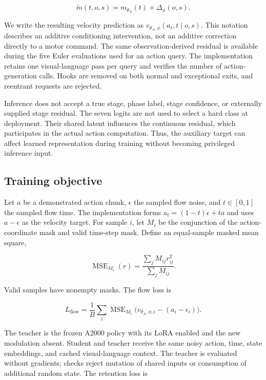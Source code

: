 \documentclass[10pt,twocolumn,letterpaper]{article}
\begin{document}
\begin{equation}\widetilde m(t,o,s)=m_{\theta_A}(t)+\Delta_\phi(o,s).\end{equation}

We write the resulting velocity prediction as $v_{\theta_A,\phi}(a_t,t\mid o,s)$. This notation describes an additive conditioning intervention, not an additive correction directly to a motor command. The same observation-derived residual is available during the five Euler evaluations used for an action query. The implementation retains one visual-language pass per query and verifies the number of action-generation calls. Hooks are removed on both normal and exceptional exits, and reentrant requests are rejected.


Inference does not accept a true stage, phase label, stage confidence, or externally supplied stage residual. The seven logits are not used to select a hard class at deployment. Their shared latent influences the continuous residual, which participates in the actual action computation. Thus, the auxiliary target can affect learned representation during training without becoming privileged inference input.


\subsection{Training objective}

Let $a$ be a demonstrated action chunk, $\epsilon$ the sampled flow noise, and $t\in[0,1]$ the sampled flow time. The implementation forms $a_t=(1-t)\epsilon+ta$ and uses $a-\epsilon$ as the velocity target. For sample $i$, let $M_i$ be the conjunction of the action-coordinate mask and valid time-step mask. Define an equal-sample masked mean square,


\begin{equation}\operatorname{MSE}_{M_i}(r)=\frac{\sum_j M_{ij}r_{ij}^{2}}{\sum_j M_{ij}}.\end{equation}

Valid samples have nonempty masks. The flow loss is


\begin{equation}L_{\mathrm{flow}}=\frac1B\sum_i\operatorname{MSE}_{M_i}\big(v_{\theta_A,\phi,i}-(a_i-\epsilon_i)\big).\end{equation}

The teacher is the frozen A2000 policy with its LoRA enabled and the new modulation absent. Student and teacher receive the same noisy action, time, state embeddings, and cached visual-language context. The teacher is evaluated without gradients; checks reject mutation of shared inputs or consumption of additional random state. The retention loss is
\end{document}
